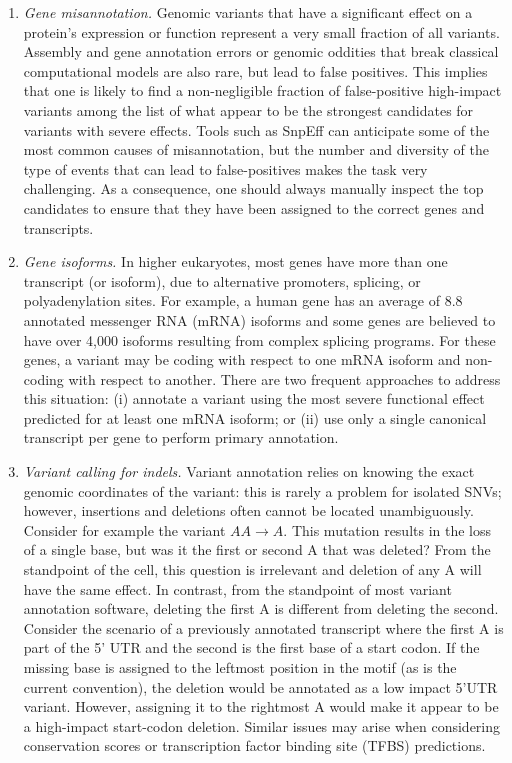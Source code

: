\begin{enumerate}[label=\roman*]
	
	\item \textit{Gene misannotation.} Genomic variants that have a significant effect on a protein's expression or function represent a very small fraction of all variants. Assembly and gene annotation errors or genomic oddities that break classical computational models are also rare, but lead to false positives. This implies that one is likely to find a non-negligible fraction of false-positive high-impact variants among the list of what appear to be the strongest candidates for variants with severe effects. Tools such as SnpEff can anticipate some of the most common causes of misannotation, but the number and diversity of the type of events that can lead to false-positives makes the task very challenging. As a consequence, one should always manually inspect the top candidates to ensure that they have been assigned to the correct genes and transcripts.
	
	\item \textit{Gene isoforms.} In higher eukaryotes, most genes have more than one transcript (or isoform), due to alternative promoters, splicing, or polyadenylation sites. For example, a human gene has an average of 8.8 annotated messenger RNA (mRNA) isoforms and some genes are believed to have over 4,000 isoforms resulting from complex splicing programs. For these genes, a variant may be coding with respect to one mRNA isoform and non-coding with respect to another. There are two frequent approaches to address this situation: (i) annotate a variant using the most severe functional effect predicted for at least one mRNA isoform; or (ii) use only a single canonical transcript per gene to perform primary annotation. 
	
	\item \textit{Variant calling for indels.} Variant annotation relies on knowing the exact genomic coordinates of the variant: this is rarely a problem for isolated SNVs; however, insertions and deletions often cannot be located unambiguously. Consider for example the variant $AA \rightarrow A$. This mutation results in the loss of a single base, but was it the first or second A that was deleted? From the standpoint of the cell, this question is irrelevant and deletion of any A will have the same effect. In contrast, from the standpoint of most variant annotation software, deleting the first A is different from deleting the second. Consider the scenario of a previously annotated transcript where the first A is part of the 5' UTR and the second is the first base of a start codon. If the missing base is assigned to the leftmost position in the motif (as is the current convention), the deletion would be annotated as a low impact 5'UTR variant. However, assigning it to the rightmost A would make it appear to be a high-impact start-codon deletion. Similar issues may arise when considering conservation scores or transcription factor binding site (TFBS) predictions.
	
\end{enumerate}

